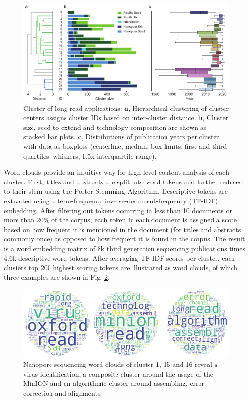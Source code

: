 \begin{figure}[h]
	\centering
	\includegraphics[width=1.0\textwidth]{figures/state_of_art/cluster_sizes.pdf}
	\captionsetup{format=plain}
	\caption[Long-Read Application Cluster]{Cluster of long-read applications: \textbf{a}, Hierarchical clustering of cluster centers assigns cluster IDs based on inter-cluster distance. \textbf{b}, Cluster size, seed to extend and technology composition are shown as stacked bar plots. \textbf{c}, Distributions of publication years per cluster with data as boxplots (centerline, median; box limits, first and third quartiles; whiskers, 1.5x interquartile range).}
	\label{fig:state_of_art:cluster_sizes}
\end{figure}

Word clouds provide an intuitive way for high-level content analysis of each cluster.
First, titles and abstracts are split into word tokens and further reduced to their stem using the Porter Stemming Algorithm.
Descriptive tokens are extracted using a term-frequency inverse-document-frequency (TF-IDF) embedding.
After filtering out tokens occurring in less than 10 documents or more than 20\% of the corpus, each token in each document is assigned a score based on how frequent it is mentioned in the document (for titles and abstracts commonly once) as opposed to how frequent it is found in the corpus.
The result is a word embedding matrix of 8k third generation sequencing publications times 4.6k descriptive word tokens.
After averaging TF-IDF scores per cluster, each clusters top 200 highest scoring tokens are illustrated as word clouds, of which three examples are shown in Fig. \ref{fig:state_of_art:wcs_minion}.

\begin{figure}[h]
	\centering
	\includegraphics[width=1.0\textwidth]{figures/state_of_art/wcs_minion.pdf}
	\captionsetup{format=plain}
	\caption[Nanopore Sequencing Word Clouds]{Nanopore sequencing word clouds of cluster 1, 15 and 16 reveal a virus identification, a composite cluster around the usage of the MinION and an algorithmic cluster around assembling, error correction and alignments.}
	\label{fig:state_of_art:wcs_minion}
\end{figure}

